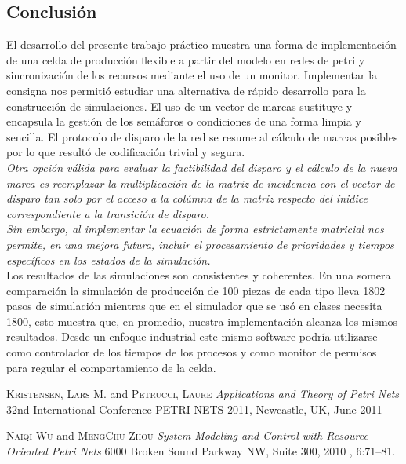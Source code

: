 \documentclass[10pt]{article} %
\begin{document}
\subsection{Conclusión} %
El desarrollo del presente trabajo práctico muestra una forma de implementación de una celda de producción flexible a partir del modelo en redes de petri y sincronización de los recursos mediante el uso de un monitor.
Implementar la consigna nos permitió estudiar una alternativa de rápido desarrollo para la construcción de simulaciones.
El uso de un vector de marcas sustituye y encapsula la gestión de los semáforos o condiciones de una forma limpia y sencilla.
El protocolo de disparo de la red se resume al cálculo de marcas posibles por lo que resultó de codificación trivial y segura.\\
\emph{Otra opción válida para evaluar la factibilidad del disparo y el cálculo de la nueva marca es reemplazar la multiplicación de la matriz de incidencia  con el vector de disparo tan solo por el acceso a la colúmna de la matriz respecto del ínidice correspondiente a la transición de disparo.\\
Sin embargo, al implementar la ecuación de forma estrictamente matricial nos permite, en una mejora futura, incluir el procesamiento de prioridades y tiempos específicos en los estados de la simulación.\\}
Los resultados de las simulaciones son consistentes y coherentes. En una somera comparación la simulación de producción de 100 piezas de cada tipo lleva 1802 pasos de simulación mientras que en el simulador que se usó en clases necesita 1800, esto muestra que, en promedio, nuestra implementación alcanza los mismos resultados.
Desde un enfoque industrial este mismo software podría utilizarse como controlador de los tiempos de los procesos y como monitor de permisos para regular el comportamiento de la celda.


\begin{thebibliography}{99} %

 \textsc{Kristensen, Lars M.} and \textsc{Petrucci, Laure}
\textit{Applications and Theory of Petri Nets}
32nd International Conference PETRI NETS 2011, Newcastle, UK, June 2011

 \textsc{Naiqi Wu} and \textsc{MengChu Zhou}
\textit{System Modeling
and Control with
Resource-Oriented
Petri Nets}
6000 Broken Sound Parkway NW, Suite 300, 2010
, 6:71--81.



\end{thebibliography}

\end{document}
